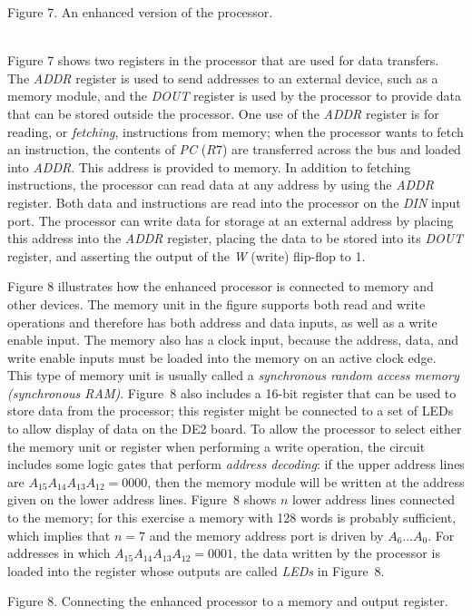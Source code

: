 \documentclass[epsfig,10pt,fullpage]{article}
\begin{document}
\begin{figure}[H]
\scriptsize
\centerline{
\hbox{}}
\end{figure}
\centerline{Figure 7. An enhanced version of the processor.}
~\\

Figure 7 shows two registers in the processor that are used for data transfers. The 
{\it ADDR}
register is used to send addresses to an external device, such as a memory module, and the
{\it DOUT} register is used by the processor to provide data that can be stored outside the
processor. One use of the {\it ADDR} register is for reading, or {\it fetching}, instructions 
from memory; when the processor wants to fetch an instruction, the contents of {\it PC} ($R7$) are
transferred across the bus and loaded into {\it ADDR}. This address is provided to memory. 
In addition to
fetching instructions, the processor can read data at any address by using the {\it ADDR}
register. Both data and instructions are read into the processor on the {\it DIN} input port.
The processor can write data for storage at an external address by placing this address 
into the {\it ADDR} register, placing the data to be stored into its {\it DOUT} register, 
and asserting the output of the {\it W} (write) flip-flop to 1. 

Figure 8 illustrates how the enhanced processor is connected to memory and other devices.
The memory unit in the figure supports both read and write operations and therefore has 
both address and data inputs, as well as a write enable input. The memory also has a clock
input, because the address, data, and write enable inputs must be loaded into the memory
on an active clock edge. This type of memory unit is usually called a {\it synchronous random
access memory (synchronous RAM)}. Figure~8 also includes a 16-bit register that can be used
to store data from the processor; this register might be connected to a set of
LEDs to allow display of data on the DE2 board. To allow the processor to select either the
memory unit or register when performing a write operation, the circuit includes some logic gates
that perform {\it address decoding}: if the upper address lines are
$A_{15} A_{14} A_{13} A_{12} = 0000$, then the memory module will be written at the
address given on the lower address lines. Figure~8 shows $n$ lower address lines connected
to the memory; for this exercise a memory with 128 words is probably sufficient, which
implies that $n = 7$ and the memory address port is driven by $A_6 \ldots A_0$. For
addresses in which $A_{15} A_{14} A_{13} A_{12} = 0001$, the data written by the processor
is loaded into the register whose outputs are called {\it LEDs} in Figure~8.
~\\
\begin{figure}[H]
\scriptsize
\centerline{
\hbox{}}
\end{figure}
\centerline{Figure 8. Connecting the enhanced processor to a memory and output register.}
\end{document}
